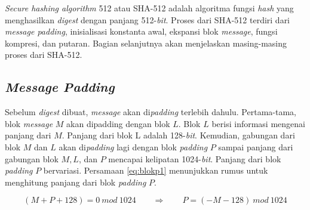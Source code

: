 \textit{Secure hashing algorithm} 512 atau SHA-512 adalah algoritma fungsi \textit{hash} yang menghasilkan \textit{digest} dengan panjang 512-\textit{bit}. Proses dari SHA-512 terdiri dari \textit{message padding}, inisialisasi konstanta awal, ekspansi blok \textit{message}, fungsi kompresi, dan putaran. Bagian selanjutnya akan menjelaskan masing-masing proses dari SHA-512.

\subsection{\textit{Message Padding}}

Sebelum \textit{digest} dibuat, \textit{message} akan di\textit{padding} terlebih dahulu. Pertama-tama, blok \textit{message} \begin{math}M\end{math} akan dipadding dengan blok \begin{math}L\end{math}. Blok \begin{math}L\end{math} berisi informasi mengenai panjang dari \begin{math}M\end{math}. Panjang dari blok L adalah 128-\textit{bit}. Kemudian, gabungan dari blok \begin{math}M\end{math} dan \begin{math}L\end{math} akan di\textit{padding} lagi dengan blok \textit{padding} \begin{math}P\end{math} sampai panjang dari gabungan blok \begin{math}M, L\end{math}, dan \begin{math}P\end{math} mencapai kelipatan 1024-\textit{bit}. Panjang dari blok \textit{padding} \begin{math}P\end{math} bervariasi. Persamaan \ref{eq:blokp1} menunjukkan rumus untuk menghitung panjang dari blok \textit{padding} \begin{math}P\end{math}.

\begin{equation}
	(M + P + 128) = 0\: mod\: 1024 \qquad\Rightarrow\qquad P = (-M - 128)\: mod\: 1024 \label{eq:blokp1}
\end{equation}

